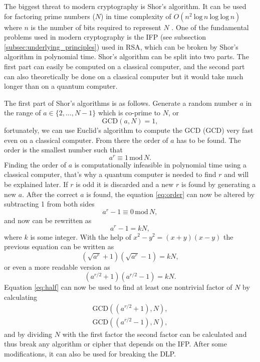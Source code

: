 The biggest threat to modern cryptography is Shor's algorithm. It can be used for factoring prime numbers ($N$) in time complexity of $O(n^2\ \mathrm{log}\,n\ \mathrm{log}\ \mathrm{log}\,n)$ where $n$ is the number of bits required to represent $N$ \cite{Yanofsky2008}. One of the fundamental problems used in modern cryptography is the IFP (see subsection \ref{subsec:underlying_principles}) used in RSA, which can be broken by Shor's algorithm in polynomial time. Shor's algorithm can be split into two parts. The first part can easily be computed on a classical computer, and the second part can also theoretically be done on a classical computer but it would take much longer than on a quantum computer.

The first part of Shor's algorithms is as follows. Generate a random number $a$ in the range of $a\in\{2,\dots,N-1\}$ which is co-prime to $N$, or
\begin{equation}
  \mathrm{GCD}(a, N) = 1,
\end{equation}
fortunately, we can use Euclid's algorithm to compute the GCD (\acl{GCD}) very fast even on a classical computer. From there the order of $a$ has to be found. The order is the smallest number such that
\begin{equation}
  \label{eq:order}
  a^r \equiv 1\,\mathrm{mod}\,N.
\end{equation}
Finding the order of $a$ is computationally infeasible in polynomial time using a classical computer, that's why a quantum computer is needed to find $r$ and will be explained later. If $r$ is odd it is discarded and a new $r$ is found by generating a new $a$. After the correct $a$ is found, the equation \ref{eq:order} can now be altered by subtracting 1 from both sides
\begin{equation}
  a^r -1\equiv 0\,\mathrm{mod}\,N,
\end{equation}
and now can be rewritten as
\begin{equation}
  a^r -1=kN,
\end{equation}
where $k$ is some integer. With the help of $x^2 - y^2=(x+y)(x-y)$ the previous equation can be written as
\begin{equation}
  (\sqrt{a^r}+1)(\sqrt{a^r}-1)= kN,
\end{equation}
or even a more readable version as
\begin{equation}
  \label{eq:half}
  (a^{r/2}+1)(a^{r/2}-1)= kN.
\end{equation}
Equation \ref{eq:half} can now be used to find at least one nontrivial factor of $N$ by calculating
\begin{equation}
  \begin{aligned}
    \mathrm{GCD}((a^{r/2}+1), N), \\
    \mathrm{GCD}((a^{r/2}-1), N),
  \end{aligned}
\end{equation}
and by dividing $N$ with the first factor the second factor can be calculated and thus break any algorithm or cipher that depends on the IFP. After some modifications, it can also be used for breaking the DLP. \cite{Yanofsky2008}\cite{Pittenger2000}

